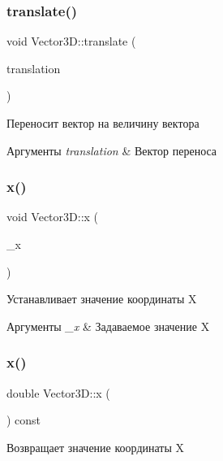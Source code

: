 \subsubsection{\texorpdfstring{translate()}{translate()}}
{\footnotesize\ttfamily void Vector3\+D\+::translate (\begin{DoxyParamCaption}\item[{const \mbox{\hyperlink{class_vector3_d}{Vector3D}} \&}]{translation }\end{DoxyParamCaption})}

Переносит вектор на величину вектора 
\begin{DoxyParams}{Аргументы}
{\em translation} & Вектор переноса \\
\hline
\end{DoxyParams}
\mbox{\label{class_vector3_d_ae381f80124491707b36640a488515b61}} 
\subsubsection{\texorpdfstring{x()}{x()}\hspace{0.1cm}{\footnotesize\ttfamily [1/2]}}
{\footnotesize\ttfamily void Vector3\+D\+::x (\begin{DoxyParamCaption}\item[{const double}]{\+\_\+x }\end{DoxyParamCaption})}

Устанавливает значение координаты X 
\begin{DoxyParams}{Аргументы}
{\em \+\_\+x} & Задаваемое значение X \\
\hline
\end{DoxyParams}
\mbox{\label{class_vector3_d_ac86d9a556616f4c51fecbaf7d8658ce8}} 
\subsubsection{\texorpdfstring{x()}{x()}\hspace{0.1cm}{\footnotesize\ttfamily [2/2]}}
{\footnotesize\ttfamily double Vector3\+D\+::x (\begin{DoxyParamCaption}{ }\end{DoxyParamCaption}) const}

Возвращает значение координаты X \mbox{\label{class_vector3_d_a70ea2945f8197058fb2426c2a2c08bf2}} 
